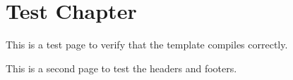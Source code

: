 \documentclass[11pt, twoside]{memoir}
\begin{document}
\chapter{Test Chapter}
This is a test page to verify that the template compiles correctly.

\newpage
This is a second page to test the headers and footers.
\end{document}
